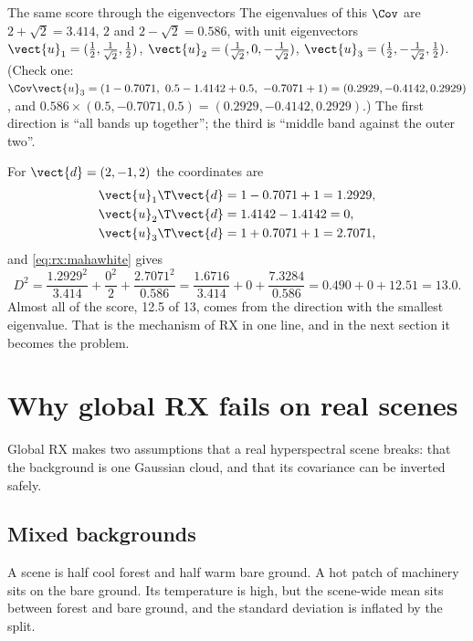 \begin{worked}[label={we:rx:threeeig}]{The same score through the eigenvectors}
The eigenvalues of this $\Cov$ are $2 + \sqrt2 = 3.414$, $2$ and $2 - \sqrt2 = 0.586$, with unit
eigenvectors $\vect{u}_1 = (\tfrac12, \tfrac{1}{\sqrt2}, \tfrac12)$, $\vect{u}_2 = (\tfrac{1}{\sqrt2},
0, -\tfrac{1}{\sqrt2})$, $\vect{u}_3 = (\tfrac12, -\tfrac{1}{\sqrt2}, \tfrac12)$. (Check one:
$\Cov\vect{u}_3 = (1 - 0.7071,\ 0.5 - 1.4142 + 0.5,\ -0.7071 + 1) = (0.2929, -0.4142, 0.2929)$, and
$0.586\times(0.5, -0.7071, 0.5) = (0.2929, -0.4142, 0.2929)$.) The first direction is ``all bands
up together''; the third is ``middle band against the outer two''.

For $\vect{d} = (2, -1, 2)$ the coordinates are
\begin{align*}
\vect{u}_1\T\vect{d} &= 1 - 0.7071 + 1 = 1.2929,\\
\vect{u}_2\T\vect{d} &= 1.4142 - 1.4142 = 0,\\
\vect{u}_3\T\vect{d} &= 1 + 0.7071 + 1 = 2.7071,
\end{align*}
and \cref{eq:rx:mahawhite} gives
\[
D^2 = \frac{1.2929^2}{3.414} + \frac{0^2}{2} + \frac{2.7071^2}{0.586}
= \frac{1.6716}{3.414} + 0 + \frac{7.3284}{0.586} = 0.490 + 0 + 12.51 = 13.0 .
\]
Almost all of the score, 12.5 of 13, comes from the direction with the smallest eigenvalue. That is
the mechanism of RX in one line, and in the next section it becomes the problem.
\end{worked}

\section{Why global RX fails on real scenes}\label{sec:rx:fails}

Global RX makes two assumptions that a real hyperspectral scene breaks: that the background is one
Gaussian cloud, and that its covariance can be inverted safely.

\subsection{Mixed backgrounds}

A scene is half cool forest and half warm bare ground. A hot patch of machinery sits on the bare
ground. Its temperature is high, but the scene-wide mean sits between forest and bare ground, and the
standard deviation is inflated by the split.

